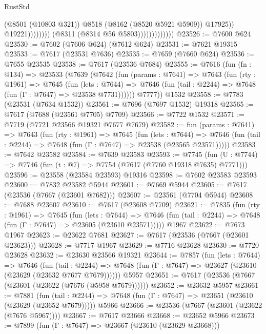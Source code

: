 \begin{lexlean}{RustStd}
\begin{coremodule}
                                              (@8501 (@10803 @321))
                                              @8518
                                              (@8162 (@8520 @5921 @5909))
                                              @17925))
                                          @19221))))))))
                          (@8311 (@8314 @56 @5803)))))))))))))
@23526 := @7600 @624
@23530 := @7602 (@7606 @624) (@7612 @624)
@23531 := @7621 @19315
@23533 := @7617 (@23531 @7636)
@23535 := @7659 (@7660 @624)
@23536 := @7655 @23535
@23538 := @7617 (@23536 @7684)
@23555 := @7616
    (fun (fn : @134) =>
    @23533
      (@7639
        (@7642
          (fun (params : @7641) =>
          @7643
            (fun (rty : @1961) =>
            @7645
              (fun (lets : @7644) =>
              @7646 (fun (tail : @2244) => @7648 (fun (Γ : @7647) => @23538 @7731))))))
        @7777))
    @1532
@23558 := @7783 (@23531 (@7634 @1532))
@23561 := @7696 (@7697 @1532) @19318
@23565 := @7617 (@7688 (@23561 @7705) @7709)
@23566 := @7722 @1532
@23571 := @7719 (@7721 @23566 @19321 @7677 @7679)
@23582 := fun (params : @7641) =>
  @7643
    (fun (rty : @1961) =>
    @7645
      (fun (lets : @7644) =>
      @7646 (fun (tail : @2244) => @7648 (fun (Γ : @7647) => @23538 (@23565 @23571)))))
@23583 := @7642 @23582
@23584 := @7639 @23583
@23593 := @7745
    (fun (U : @7744) => @7746 (fun (t : @7) => @7754 (@7617 (@7760 @19318 @7635) @7771)))
@23596 := @23558 (@23584 @23593) @19316
@23598 := @7602 @23583 @23593
@23600 := @7832 @23582 @5944
@23601 := @7669 @5944
@23605 := @7617 (@23536 (@7667 (@23601 @7682)))
@23607 := @23561 (@7704 @5944)
@23608 := @7688 @23607
@23610 := @7617 (@23608 @7709)
@23621 := @7835
    (fun (rty : @1961) =>
    @7645
      (fun (lets : @7644) =>
      @7646 (fun (tail : @2244) => @7648 (fun (Γ : @7647) => @23605 (@23610 @23571)))))
    @1967
@23622 := @7673 @1967
@23623 := @23622 @7681
@23627 := @7617 (@23536 (@7667 (@23601 @23623)))
@23628 := @7717 @1967
@23629 := @7716 @23628
@23630 := @7720 @23628
@23632 := @23630 @23566 @19321
@23644 := @7857
    (fun (lets : @7644) =>
    @7646
      (fun (tail : @2244) =>
      @7648 (fun (Γ : @7647) => @23627 (@23610 (@23629 (@23632 @7677 @7679))))))
    @5957
@23651 := @7617 (@23536 (@7667 (@23601 (@23622 (@7676 (@5958 @7679))))))
@23652 := @23632 @5957
@23661 := @7881
    (fun (tail : @2244) => @7648 (fun (Γ : @7647) => @23651 (@23610 (@23629 (@23652 @7679)))))
    @5966
@23666 := @23536 (@7667 (@23601 (@23622 (@7676 @5967))))
@23667 := @7617 @23666
@23668 := @23652 @5966
@23673 := @7899 (fun (Γ : @7647) => @23667 (@23610 (@23629 @23668)))

\end{coremodule}
\end{lexlean}
